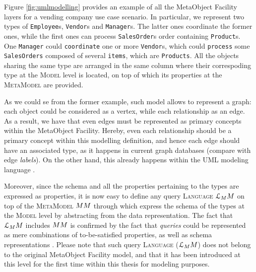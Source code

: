 \begin{example}
	Figure \ref{fig:umlmodelling} provides an example of all the MetaObject Facility layers for a vending company use case scenario. In particular, we represent two types of \texttt{Employee}s, \texttt{Vendor}s and \texttt{Manager}s. The latter ones coordinate the former ones, while the first ones can process \texttt{SalesOrder}s order containing \texttt{Product}s. One \texttt{Manager} could \texttt{coordinate} one or more \texttt{Vendor}s, which could \texttt{process} some \texttt{SalesOrders} composed of several \texttt{items}, which are \texttt{Products}. All the objects sharing the same type are arranged in the same column where their correspoding type at the \textsc{Model} level is located, on top of which its properties at the \textsc{MetaModel} are provided.
\end{example}

As we could se from the former example, such model allows to represent a graph: each object could be considered as a vertex, while each relationship as an edge. As a result, we have that even edges must be represented as primary concepts within the  MetaObject Facility. Hereby, even each relationship should be a primary concept within this modelling definition, and hence each edge should have an associated type, as it happens in current graph databases (compare with edge \textit{labels}). On the other hand, this already happens within the UML modeling language \cite{OMG2011a, OMG2011}.

Moreover, since the schema and all the properties pertaining to the types are expressed as properties, it is now easy to define any query \textsc{Language} $\langg_\metamodel$ on top of the \textsc{MetaModel} $\metamodel$ through which express the schema of the types at the \textsc{Model} level by abstracting from the data representation. The fact that $\langg_\metamodel$ includes $\metamodel$ is confirmed by the fact that \textit{queries} could be represented as mere combinations of to-be-satisfied properties, as well as schema representations \cite{Lenzerini02}. Please note that such query  \textsc{Language} ($\langg_\metamodel$) does not belong to the original MetaObject Facility model, and that it has been introduced at this level for the first time within this thesis for modeling purposes.

